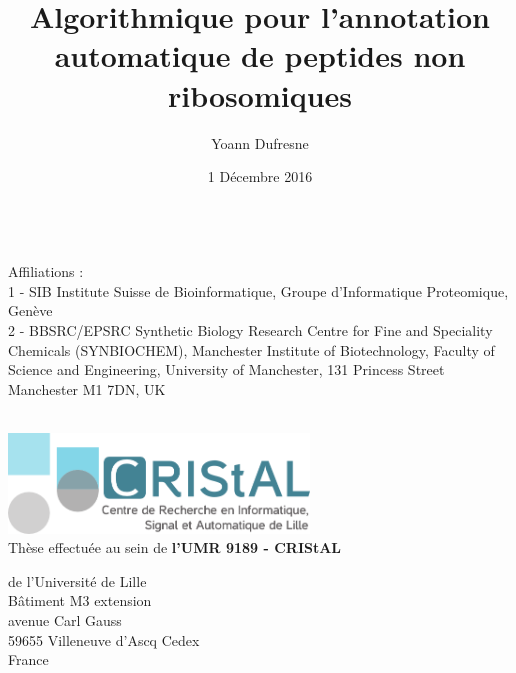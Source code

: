 \documentclass[12pt]{LHSV_thesis}
\begin{document}
\title{Algorithmique pour l'annotation automatique de peptides non ribosomiques}
\author{Yoann Dufresne}
\date{1 Décembre 2016}


\maketitle
\clearpage

~\vspace{3.0cm}\\
Affiliations :\\
1 - SIB Institute Suisse de Bioinformatique, Groupe d'Informatique Proteomique, Genève\\
2 - BBSRC/EPSRC Synthetic Biology Research Centre for Fine and Speciality Chemicals (SYNBIOCHEM), Manchester Institute of Biotechnology, Faculty of Science and Engineering, University of Manchester, 131 Princess Street Manchester M1 7DN, UK


\begin{center}
~\vspace{3.0cm}\\
\thispagestyle{plain}
\includegraphics[width=0.6\textwidth]{logocristal}\vspace{0.5cm}\\
Thèse effectuée au sein de \textbf{l'UMR 9189 - CRIStAL}\par 
 de l'Université de Lille\\
Bâtiment M3 extension\\
avenue Carl Gauss\\
59655 Villeneuve d'Ascq Cedex\\
France
\vspace*{\fill}
\clearpage
\end{center}
\end{document}
